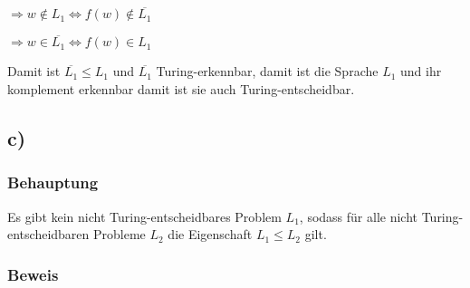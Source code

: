 $\Rightarrow  w \notin L_1 \Leftrightarrow f(w) \notin \overline{L_1}$

$\Rightarrow w \in \overline{L_1} \Leftrightarrow f(w) \in L_1$

Damit ist $\overline{L_1} \leq L_1$ und $\overline{L_1}$ Turing-erkennbar, damit ist die Sprache $L_1$ und ihr komplement erkennbar damit ist sie auch Turing-entscheidbar.


\subsection*{c)}

\subsubsection*{Behauptung}


Es gibt kein nicht Turing-entscheidbares Problem $L_1$, sodass für alle nicht Turing-entscheidbaren
Probleme $L_2$ die Eigenschaft $L_1 \leq L_2$ gilt.

\subsubsection*{Beweis}





